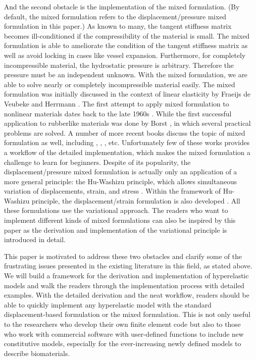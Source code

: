 And the second obstacle is the implementation of the mixed formulation. (By default, the mixed formulation refers to the displacement/pressure mixed formulation in this paper.) As known to many, the tangent stiffness matrix becomes ill-conditioned if the compressibility of the material is small. The mixed formulation is able to ameliorate the condition of the tangent stiffness matrix as well as avoid locking in cases like vessel expansion. Furthermore, for completely incompressible material, the hydrostatic pressure is arbitrary. Therefore the pressure must be an independent unknown. With the mixed formulation, we are able to solve nearly or completely incompressible material easily. 
The mixed formulation was initially discussed in the context of linear elasticity by Fraeijs de Veubeke \cite{Veubeke} and Herrmann \cite{Herrmann}. The first attempt to apply mixed formulation to nonlinear materials dates back to the late 1960s \cite{Oden}. While the first successful application to rubberlike materials was done by Borst \cite{Borst}, in which several practical problems are solved. A number of more recent books discuss the topic of mixed formulation as well, including \cite{Bathe}, \cite{Holzapfel}, \cite{Zienkiewicz}, etc. Unfortunately few of these works provides a workflow of the detailed implementation, which makes the mixed formulation a challenge to learn for beginners. Despite of its popularity, the displacement/pressure mixed formulation is actually only an application of a more general principle: the Hu-Washizu principle, which allows simultaneous variation of displacements, strain, and stress \cite{Hu}. Within the framework of Hu-Washizu principle, the displacement/strain formulation is also developed \cite{Cervera, Rifai}. All these formulations use the variational approach. The readers who want to implement different kinds of mixed formulations can also be inspired by this paper as the derivation and implementation of the variational principle is introduced in detail. 

This paper is motivated to address these two obstacles and clarify some of the frustrating issues presented in the existing literature in this field, as stated above. We will build a framework for the derivation and implementation of hyperelastic models and walk the readers through the implementation process with detailed examples. With the detailed derivation and the neat workflow, readers should be able to quickly implement any hyperelastic model with the standard displacement-based formulation or the mixed formulation. This is not only useful to the researchers who develop their own finite element code but also to those who work with commercial software with user-defined functions to include new constitutive models, especially for the ever-increasing newly defined models to describe biomaterials.

